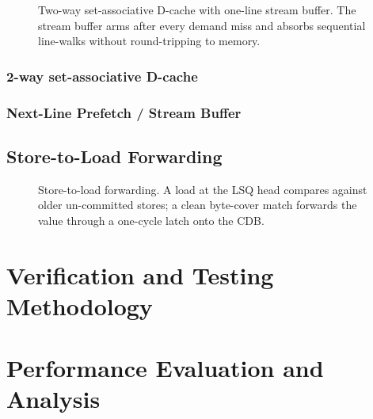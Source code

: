 \documentclass[conference]{IEEEtran}
\begin{document}
\begin{figure}[t]
    \centering
    
    \caption{Two-way set-associative D-cache with one-line stream buffer. The stream buffer arms after every demand miss and absorbs sequential line-walks without round-tripping to memory.}
    \label{fig:dcache}
\end{figure}

\subsubsection{2-way set-associative D-cache}

\subsubsection{Next-Line Prefetch / Stream Buffer}

\subsection{Store-to-Load Forwarding}

\begin{figure}[t]
    \centering
    
    \caption{Store-to-load forwarding. A load at the LSQ head compares against older un-committed stores; a clean byte-cover match forwards the value through a one-cycle latch onto the CDB.}
    \label{fig:stlf}
\end{figure}

\section{Verification and Testing Methodology}

\section{Performance Evaluation and Analysis}


\end{document}
